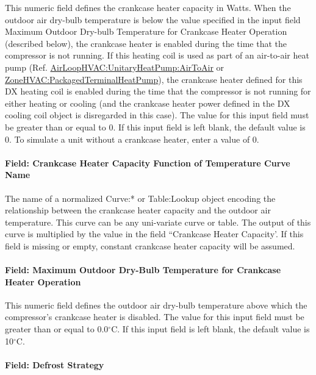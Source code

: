 This numeric field defines the crankcase heater capacity in Watts. When the outdoor air dry-bulb temperature is below the value specified in the input field Maximum Outdoor Dry-bulb Temperature for Crankcase Heater Operation (described below), the crankcase heater is enabled during the time that the compressor is not running. If this heating coil is used as part of an air-to-air heat pump (Ref. \hyperref[airloophvacunitaryheatpumpairtoair]{AirLoopHVAC:UnitaryHeatPump:AirToAir} or \hyperref[zonehvacpackagedterminalheatpump]{ZoneHVAC:PackagedTerminalHeatPump}), the crankcase heater defined for this DX heating coil is enabled during the time that the compressor is not running for either heating or cooling (and the crankcase heater power defined in the DX cooling coil object is disregarded in this case). The value for this input field must be greater than or equal to 0. If this input field is left blank, the default value is 0. To simulate a unit without a crankcase heater, enter a value of 0.

\paragraph{Field: Crankcase Heater Capacity Function of Temperature Curve Name}

The name of a normalized Curve:* or Table:Lookup object encoding the relationship between the crankcase heater capacity and the outdoor air temperature. This curve can be any uni-variate curve or table. The output of this curve is multiplied by the value in the field ``Crankcase Heater Capacity'. If this field is missing or empty, constant crankcase heater capacity will be
assumed.

\paragraph{Field: Maximum Outdoor Dry-Bulb Temperature for Crankcase Heater Operation}\label{field-maximum-outdoor-dry-bulb-temperature-for-crankcase-heater-operation-4}

This numeric field defines the outdoor air dry-bulb temperature above which the compressor's crankcase heater is disabled. The value for this input field must be greater than or equal to 0.0$^\circ$C. If this input field is left blank, the default value is 10$^\circ$C.

\paragraph{Field: Defrost Strategy}\label{field-defrost-strategy}

